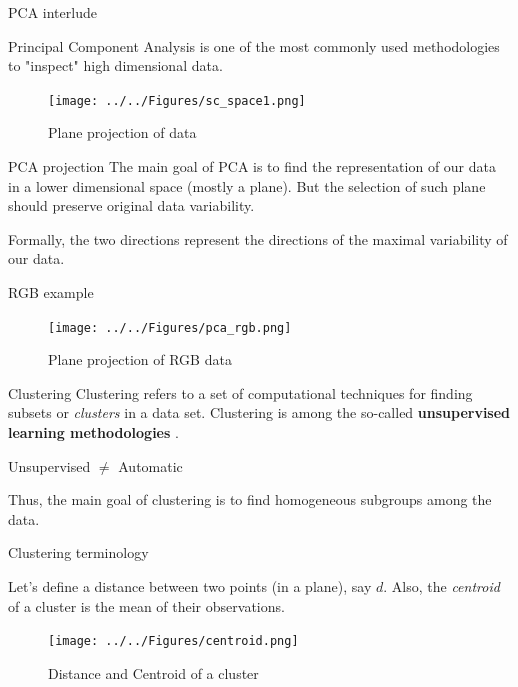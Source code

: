 \documentclass{beamer}
\begin{document}
\begin{frame}{PCA interlude}

Principal Component Analysis is one of the most commonly used methodologies to "inspect" high dimensional data. 

\begin{figure}[h]
	\centering
	\texttt{[image: ../../Figures/sc\_space1.png]}
	\caption{Plane projection of data}
\end{figure}	
	
\end{frame}	

\begin{frame}{PCA projection}
	The main goal of PCA  is to find the representation of our data in a lower dimensional space (mostly a plane). But the selection of such plane should preserve original data variability. 
	
	Formally, the two directions represent the directions of the maximal variability of our data. 

\end{frame}	

\begin{frame}{RGB example}
\begin{figure}[h]
	\centering
	\texttt{[image: ../../Figures/pca\_rgb.png]}
	\caption{Plane projection of RGB data}
\end{figure}		


\end{frame}	

\begin{frame}{Clustering}
	Clustering refers to a set of computational techniques for finding subsets or {\sl clusters} in a data set.  Clustering is among the so-called {\bf unsupervised learning methodologies } .\\
	
	\begin{center}
		Unsupervised $\ne$ Automatic
	\end{center}
	
	Thus, the main goal of clustering is to find homogeneous subgroups among the data. 
		
\end{frame}
	
\begin{frame}{Clustering terminology}
	


Let's define a distance between two points (in a plane), say $d$. Also, the {\sl centroid } of a cluster is the mean of their observations.

\begin{figure}[h]
	\centering
	\texttt{[image: ../../Figures/centroid.png]}
	\caption{Distance and Centroid of a cluster}
\end{figure}	
\end{frame}
\end{document}
